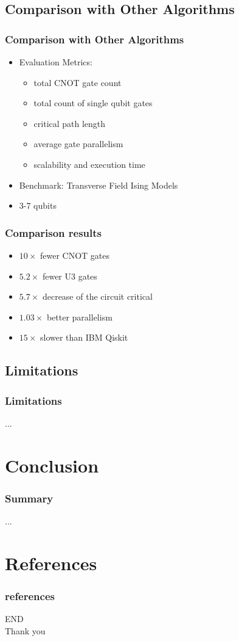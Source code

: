 \documentclass[aspectratio=1610]{beamer}
\begin{document}
\subsection{Comparison with Other Algorithms}
\begin{frame}
\frametitle{Comparison with Other Algorithms}
\begin{itemize}
  \item Evaluation Metrics:
  \begin{itemize}
    \item total CNOT gate count
    \item total count of single qubit gates
    \item critical path length
    \item average gate parallelism
    \item scalability and execution time
  \end{itemize}
  \item Benchmark: Transverse Field Ising Models
  \item 3-7 qubits
\end{itemize}
\end{frame}
\begin{frame}
\frametitle{Comparison results}
\begin{itemize}
  \item $10\times$ fewer CNOT gates
  \item $5.2\times$ fewer U3 gates
  \item $5.7\times$ decrease of the circuit critical
  \item $1.03\times$ better parallelism
  \item $15\times$ slower than IBM Qiskit
\end{itemize}
\end{frame}
\subsection{Limitations}
\begin{frame}
\frametitle{Limitations}
...
\end{frame}

\section{Conclusion}
\begin{frame}
\frametitle{Summary}
...
\end{frame}

\section{References}
\begin{frame}
	\frametitle{references}
	\printbibliography
\end{frame}
\begin{frame}
  \centering
  \Huge{END\\Thank you}
\end{frame}
\end{document}
